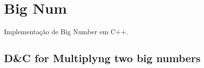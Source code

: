 \section{Big Num}
    Implementação de Big Number em C++.
    \subsection{D\&C for Multiplyng two big numbers}
